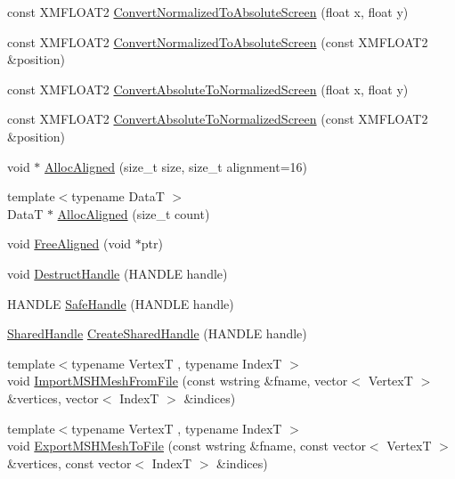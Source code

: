 \begin{DoxyCompactItemize}
const X\+M\+F\+L\+O\+A\+T2 \hyperlink{namespacemage_a34b18c1eb8d1e94675b10c86845e2564}{Convert\+Normalized\+To\+Absolute\+Screen} (float x, float y)
\item 
const X\+M\+F\+L\+O\+A\+T2 \hyperlink{namespacemage_aec1ce8ea913d981f727765f39f79d5e3}{Convert\+Normalized\+To\+Absolute\+Screen} (const X\+M\+F\+L\+O\+A\+T2 \&position)
\item 
const X\+M\+F\+L\+O\+A\+T2 \hyperlink{namespacemage_a98a82c6ca513d50f16d4ee6256fdac29}{Convert\+Absolute\+To\+Normalized\+Screen} (float x, float y)
\item 
const X\+M\+F\+L\+O\+A\+T2 \hyperlink{namespacemage_a9ef1aad29d7631ee2d88467faca6cc56}{Convert\+Absolute\+To\+Normalized\+Screen} (const X\+M\+F\+L\+O\+A\+T2 \&position)
\item 
void $\ast$ \hyperlink{namespacemage_a5bfc93e9988b3b967b2e0bbf9256eee2}{Alloc\+Aligned} (size\+\_\+t size, size\+\_\+t alignment=16)
\item 
{\footnotesize template$<$typename DataT $>$ }\\DataT $\ast$ \hyperlink{namespacemage_a8facb28d3867eefd618db6c859d349d5}{Alloc\+Aligned} (size\+\_\+t count)
\item 
void \hyperlink{namespacemage_a401c54df21447c491c527735647b5f80}{Free\+Aligned} (void $\ast$ptr)
\item 
void \hyperlink{namespacemage_a7bf12816896ea8d126d397f0c6d571b1}{Destruct\+Handle} (H\+A\+N\+D\+LE handle)
\item 
H\+A\+N\+D\+LE \hyperlink{namespacemage_a80f95ce7eb0d03d5576351663d626b4d}{Safe\+Handle} (H\+A\+N\+D\+LE handle)
\item 
\hyperlink{namespacemage_ab892828913d6129acf71e0cec60467e5}{Shared\+Handle} \hyperlink{namespacemage_a3119898d7caac71d8ee495c3ae3194b1}{Create\+Shared\+Handle} (H\+A\+N\+D\+LE handle)
\item 
{\footnotesize template$<$typename VertexT , typename IndexT $>$ }\\void \hyperlink{namespacemage_ad98d571312abaaa2b0b7dd13958f5100}{Import\+M\+S\+H\+Mesh\+From\+File} (const wstring \&fname, vector$<$ VertexT $>$ \&vertices, vector$<$ IndexT $>$ \&indices)
\item 
{\footnotesize template$<$typename VertexT , typename IndexT $>$ }\\void \hyperlink{namespacemage_a6558ce42c284f76e6bb08bc0f9cabfc3}{Export\+M\+S\+H\+Mesh\+To\+File} (const wstring \&fname, const vector$<$ VertexT $>$ \&vertices, const vector$<$ IndexT $>$ \&indices)
\item 

\end{DoxyCompactItemize}
